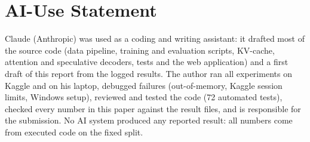 \documentclass[conference]{IEEEtran}
\begin{document}
\appendix
\section*{AI-Use Statement}
Claude (Anthropic) was used as a coding and writing assistant: it drafted most of the source code (data pipeline, training and evaluation scripts, KV-cache, attention and speculative decoders, tests and the web application) and a first draft of this report from the logged results. The author ran all experiments on Kaggle and on his laptop, debugged failures (out-of-memory, Kaggle session limits, Windows setup), reviewed and tested the code (72 automated tests), checked every number in this paper against the result files, and is responsible for the submission. No AI system produced any reported result: all numbers come from executed code on the fixed split.
\end{document}
